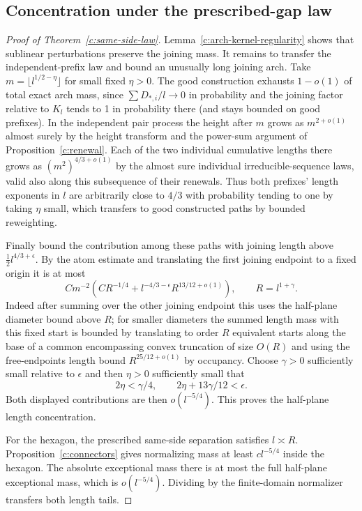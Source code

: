 \subsection{Concentration under the prescribed-gap law}
\begin{proof}[Proof of Theorem~\ref{c:same-side-law}]
Lemma~\ref{c:arch-kernel-regularity} shows that sublinear perturbations preserve the joining mass.
It remains to transfer the independent-prefix law and bound an unusually
long joining arch. Take \(m=\lfloor l^{1/2-\eta}\rfloor\) for small fixed \(\eta>0\). The good construction exhausts \(1-o(1)\) of total exact arch mass, since \(\sum D_{*,i}/l\to0\) in probability and the joining factor relative to \(K_l\) tends to 1 in probability there (and stays bounded on good prefixes). In the independent pair process the height after \(m\) grows as \(m^{2+o(1)}\) almost surely by the height transform and the power-sum argument of Proposition~\ref{c:renewal}. Each of the two individual cumulative lengths there grows as \((m^2)^{4/3+o(1)}\) by the almost sure individual irreducible-sequence laws, valid also along this subsequence of their renewals. Thus both prefixes' length exponents in \(l\) are arbitrarily close to \(4/3\) with probability tending to one by taking \(\eta\) small, which transfers to good constructed paths by bounded reweighting.



Finally bound the contribution among these paths with joining length above \(\tfrac12 l^{4/3+\epsilon}\). By the atom estimate and translating the first joining endpoint to a fixed origin it is at most
\[
 C m^{-2}\left(C R^{-1/4}+l^{-4/3-\epsilon} R^{13/12+o(1)}\right),\qquad R=l^{1+\gamma}.
\]
Indeed after summing over the other joining endpoint this uses the half-plane diameter bound above \(R\); for smaller diameters the summed length mass with this fixed start is bounded by translating to order \(R\) equivalent starts along the base of a common encompassing convex truncation of size \(O(R)\) and using the free-endpoints length bound \(R^{25/12+o(1)}\) by occupancy. Choose \(\gamma>0\) sufficiently small relative to \(\epsilon\) and then \(\eta>0\) sufficiently small that
\[
 2\eta<\gamma/4,\qquad 2\eta+13\gamma/12<\epsilon.
\]
Both displayed contributions are then $o(l^{-5/4})$. This proves the
half-plane length concentration.

For the hexagon, the prescribed same-side separation satisfies $l\asymp R$.
Proposition~\ref{c:connectors} gives normalizing mass at least
$cl^{-5/4}$ inside the hexagon. The absolute exceptional mass there is
at most the full half-plane exceptional mass, which is $o(l^{-5/4})$.
Dividing by the finite-domain normalizer transfers both length tails.

\end{proof}
